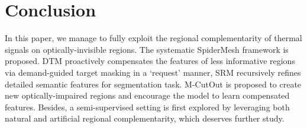 \documentclass[letterpaper, 10 pt, conference]{ieeeconf}
\begin{document}
\section{Conclusion}
In this paper, we manage to fully exploit the regional complementarity of thermal signals on optically-invisible regions. The systematic SpiderMesh framework is proposed. DTM proactively compensates the features of less informative regions via demand-guided target masking in a `request’ manner, SRM recursively refines detailed semantic features for segmentation task. M-CutOut is proposed to create new optically-impaired regions and encourage the model to learn compensated features. Besides, a semi-supervised setting is first explored by leveraging both natural and artificial regional complementarity, which deserves further study.





\end{document}
